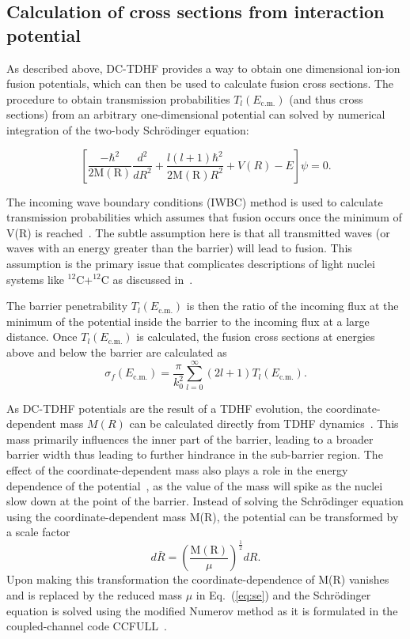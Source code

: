 \subsection{Calculation of cross sections from interaction potential}

As described above, DC-TDHF provides a way to obtain one dimensional ion-ion fusion potentials, which can then be used to calculate fusion cross sections.
The procedure to obtain transmission probabilities $T_{l}(E_{\mathrm{c.m.}})$ (and thus cross sections) from an arbitrary one-dimensional potential can solved by numerical integration of the two-body Schr\"odinger equation:

\begin{equation}
\left[\frac{-\hbar^2}{2\mathrm{M(R)}}\frac{d^2}{dR^2}+\frac{l(l+1)\hbar^2}{2\mathrm{M(R)}R^2} + V(R) - E\right]\psi=0 .
\label{eq:se}
\end{equation}

The incoming wave boundary conditions (IWBC) method is used to calculate transmission probabilities which assumes that fusion occurs once the minimum of V(R) is reached~\citep{rawitscher1964}.
The subtle assumption here is that all transmitted waves (or waves with an energy greater than the barrier) will lead to fusion.
This assumption is the primary issue that complicates descriptions of light nuclei systems like $^{12}$C+$^{12}$C as discussed in~\citep{jiang2013,godbey2019b}.

The barrier penetrability $T_l(E_{\mathrm{c.m.}})$ is then the ratio of the incoming flux at the minimum of the potential inside the barrier to the incoming flux at a large distance.
Once $T_l(E_{\mathrm{c.m.}})$ is calculated, the fusion cross sections at energies above and below the barrier are calculated as
\begin{equation}
\sigma_f(E_{\mathrm{c.m.}})=\frac{\pi}{k_0^2}\sum_{l=0}^{\infty}(2l+1)T_l(E_{\mathrm{c.m.}}).
\end{equation}

As DC-TDHF potentials are the result of a TDHF evolution, the coordinate-dependent mass $M(R)$ can
be calculated directly from TDHF dynamics~\citep{umar2009a,umar2009b}.
This mass primarily influences the inner part of the barrier, leading to a broader
barrier width thus leading to further hindrance in the sub-barrier region.
The effect of the coordinate-dependent mass also plays a role in the energy dependence of the potential~\citep{umar2014a}, as the value of the mass will spike as the nuclei slow down at the point of the barrier.
Instead of solving the Schr\"odinger equation using the coordinate-dependent mass M(R), the potential can be transformed by a scale factor~\citep{umar2009b,goeke1983}
\begin{equation}
d\bar{R}=\left(\frac{\mathrm{M(R)}}{\mu}\right)^{\frac{1}{2}}dR.
\end{equation}
Upon making this transformation the coordinate-dependence of M(R) vanishes and is replaced by the reduced mass $\mu$ in Eq.~(\ref{eq:se}) and the Schr\"odinger equation is solved using the modified Numerov method as it is formulated in the coupled-channel code CCFULL~\citep{hagino1999}.

